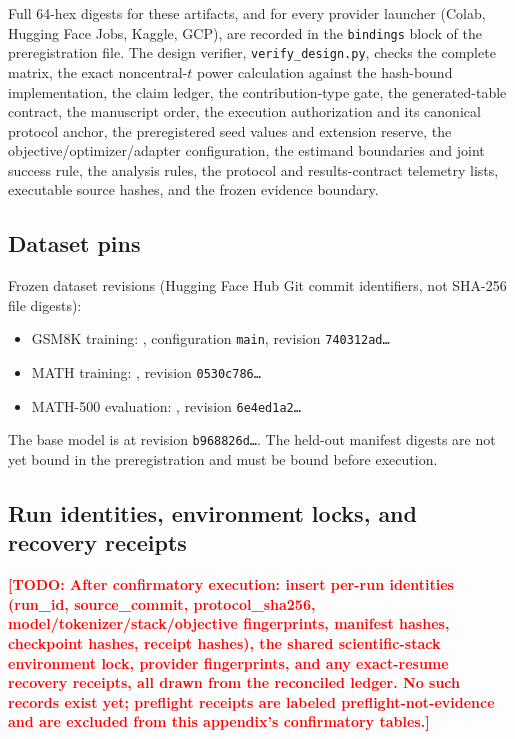 \documentclass[11pt]{article}
\newcommand{\todo}[1]{\textcolor{red}{\textbf{[TODO: #1]}}}
\begin{document}
Full 64-hex digests for these artifacts, and for every provider launcher (Colab, Hugging Face Jobs, Kaggle, GCP), are recorded in the \texttt{bindings} block of the preregistration file. The design verifier, \texttt{verify\_design.py}, checks the complete matrix, the exact noncentral-$t$ power calculation against the hash-bound implementation, the claim ledger, the contribution-type gate, the generated-table contract, the manuscript order, the execution authorization and its canonical protocol anchor, the preregistered seed values and extension reserve, the objective/optimizer/adapter configuration, the estimand boundaries and joint success rule, the analysis rules, the protocol and results-contract telemetry lists, executable source hashes, and the frozen evidence boundary.

\subsection{Dataset pins}

Frozen dataset revisions (Hugging Face Hub Git commit identifiers, not SHA-256 file digests):
\begin{itemize}
  \item GSM8K training: , configuration \texttt{main}, revision \texttt{740312ad\ldots}
  \item MATH training: , revision \texttt{0530c786\ldots}
  \item MATH-500 evaluation: , revision \texttt{6e4ed1a2\ldots}
\end{itemize}
The base model is  at revision \texttt{b968826d\ldots}. The held-out manifest digests are not yet bound in the preregistration and must be bound before execution.

\subsection{Run identities, environment locks, and recovery receipts}

\todo{After confirmatory execution: insert per-run identities (run\_id, source\_commit, protocol\_sha256, model/tokenizer/stack/objective fingerprints, manifest hashes, checkpoint hashes, receipt hashes), the shared scientific-stack environment lock, provider fingerprints, and any exact-resume recovery receipts, all drawn from the reconciled ledger. No such records exist yet; preflight receipts are labeled preflight-not-evidence and are excluded from this appendix's confirmatory tables.}
\end{document}
